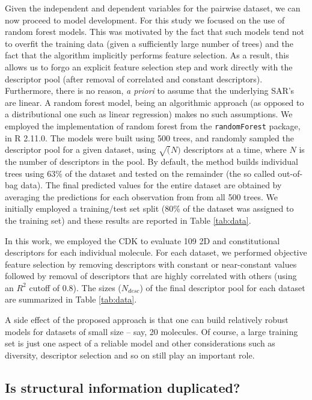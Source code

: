 \documentclass[letterpaper, 12pt]{article}
\begin{document}
Given the independent and dependent variables for the pairwise dataset, we can now proceed to model
development. For this study we focused on the use of random forest models\cite{Breiman:1984aa}. This
was motivated by the fact that such models tend not to overfit the training data (given a
sufficiently large number of trees) and the fact that the algorithm implicitly performs feature
selection. As a result, this allows us to forgo an explicit feature selection step and work directly
with the descriptor pool (after removal of correlated and constant descriptors). Furthermore, there
is no reason, \emph{a priori} to assume that the underlying SAR's are linear. A random forest model,
being an algorithmic approach\cite{Breiman:2001nx} (as opposed to a distributional one such as
linear regression) makes no such assumptions. We employed the implementation of random forest from
the \texttt{randomForest} package, in R 2.11.0\cite{r}. The models were built using 500 trees, and
randomly sampled the descriptor pool for a given dataset, using $\sqrt(N)$ descriptors at a time,
where $N$ is the number of descriptors in the pool. By default, the method builds individual trees
using 63\% of the dataset and tested on the remainder (the so called out-of-bag data). The final
predicted values for the entire dataset are obtained by averaging the predictions for each
observation from from all 500 trees. We initially employed a
training/test set split (80\% of the dataset was assigned to the training set) and these results are
reported in Table \ref{tab:data}.

In this work, we employed the CDK to evaluate 109 2D and constitutional descriptors for each
individual molecule. For each dataset, we performed objective feature selection by removing
descriptors with constant or near-constant values followed by removal of descriptors that are highly
correlated with others (using an $R^2$ cutoff of 0.8). The sizes ($N_{desc}$) of the final
descriptor pool for each dataset are summarized in Table \ref{tab:data}.

A side effect of the proposed approach is that one can build relatively robust models for datasets of
small size -- say, 20 molecules. Of course, a large training set is just one aspect of a reliable
model and other considerations such as diversity, descriptor selection and so on still play an
important role.

\subsection{Is structural information duplicated?}
\label{sec:are-we-duplicating}
\end{document}
